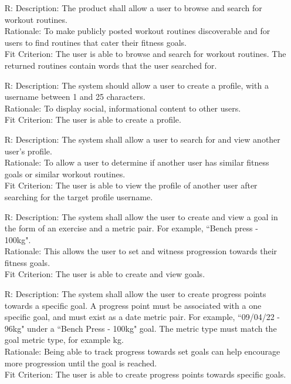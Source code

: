 \documentclass[12pt]{article}
\newcounter{reqnum} %
\begin{document}
\begin{itemize}
\item[R\refstepcounter{reqnum}\thereqnum \label{R_Inputs}:]
Description: The product shall allow a user to browse and search for workout routines.
\\ Rationale: To make publicly posted workout routines discoverable and for users to find routines that cater their fitness goals.
\\ Fit Criterion: The user is able to browse and search for workout routines. The returned routines contain words that the user searched for.

\item[R\refstepcounter{reqnum}\thereqnum \label{R_Inputs}:]
Description: The system should allow a user to create a profile, with a username between 1 and 25 characters.
\\ Rationale: To display social, informational content to other users.
\\ Fit Criterion: The user is able to create a profile.


\item[R\refstepcounter{reqnum}\thereqnum \label{R_Inputs}:]
Description: The system shall allow a user to search for and view another user's profile.
\\ Rationale: To allow a user to determine if another user has similar fitness goals or similar workout routines.
\\ Fit Criterion: The user is able to view the profile of another user after searching for the target profile username.

\item[R\refstepcounter{reqnum}\thereqnum \label{R_Inputs}:]
Description: The system shall allow the user to create and view a goal in the form of an exercise and a metric pair. For example, ``Bench press - 100kg".
\\ Rationale: This allows the user to set and witness progression towards their fitness goals.
\\ Fit Criterion: The user is able to create and view goals.

\item[R\refstepcounter{reqnum}\thereqnum \label{R_Inputs}:]
Description: The system shall allow the user to create progress points towards a specific goal.
A progress point must be associated with a one specific goal, and must exist as a date metric pair. For example, ``09/04/22 - 96kg" under a ``Bench Press - 100kg" goal. The metric type must match the goal metric type, for example kg.
\\ Rationale: Being able to track progress towards set goals can help encourage more progression until the goal is reached.
\\ Fit Criterion: The user is able to create progress points towards specific goals.


\end{itemize}
\end{document}
